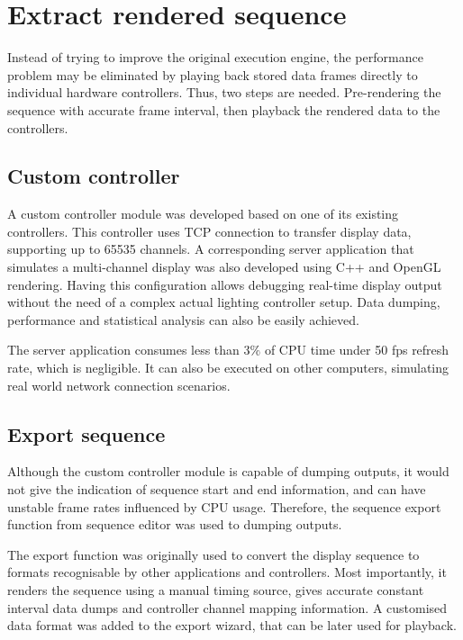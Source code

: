 \documentclass[journal]{IEEEtran}
\begin{document}


\section{Extract rendered sequence}

Instead of trying to improve the original execution engine, the performance problem may be eliminated by playing back stored data frames directly to individual hardware controllers. Thus, two steps are needed. Pre-rendering the sequence with accurate frame interval, then playback the rendered data to the controllers.

\subsection{Custom controller}

A custom controller module was developed based on one of its existing controllers. This controller uses TCP connection to transfer display data, supporting up to 65535 channels. A corresponding server application that simulates a multi-channel display was also developed using C++ and OpenGL \cite{shreiner2009opengl} rendering. Having this configuration allows debugging real-time display output without the need of a complex actual lighting controller setup. Data dumping, performance and statistical analysis can also be easily achieved. 

The server application consumes less than $3 \%$ of CPU time under 50 fps refresh rate, which is negligible. It can also be executed on other computers, simulating real world network connection scenarios.

\subsection{Export sequence}

Although the custom controller module is capable of dumping outputs, it would not give the indication of sequence start and end information, and can have unstable frame rates influenced by CPU usage. Therefore, the sequence export function from sequence editor was used to dumping outputs.

The export function was originally used to convert the display sequence to formats recognisable by other applications and controllers. Most importantly, it renders the sequence using a manual timing source, gives accurate constant interval data dumps and controller channel mapping information. A customised data format was added to the export wizard, that can be later used for playback. 
\end{document}
